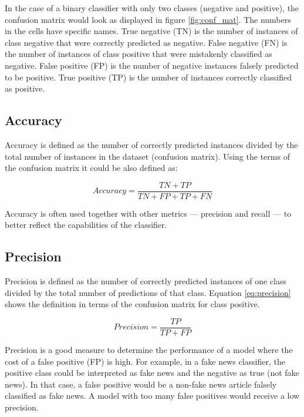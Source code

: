 In the case of a binary classifier with only two classes (negative and positive), the confusion matrix would look as displayed in figure \ref{fig:conf_mat}.
The numbers in the cells have specific names. True negative (TN) is the number of instances of class negative that were correctly predicted as negative. False negative (FN) is the number of instances of class positive that were mistakenly classified as negative. False positive (FP) is the number of negative instances falsely predicted to be positive. True positive (TP) is the number of instances correctly classified as positive.


\subsection*{Accuracy}
Accuracy is defined as the number of correctly predicted instances divided by the total number of instances in the dataset (confusion matrix). Using the terms of the confusion matrix it could be also defined as:

\begin{equation}
    Accuracy = \displaystyle{\frac{TN + TP}{TN + FP + TP + FN}}
\end{equation}

Accuracy is often used together with other metrics --- precision and recall --- to better reflect the capabilities of the classifier.

\subsection*{Precision}
Precision is defined as the number of correctly predicted instances of one class divided by the total number of predictions of that class. Equation \ref{eq:precision} shows the definition in terms of the confusion matrix for class positive.

\begin{equation}
    \label{eq:precision}
    Precision = \displaystyle{\frac{TP}{TP + FP}}
\end{equation}

Precision is a good measure to determine the performance of a model where the cost of a false positive (FP) is high. For example, in a fake news classifier, the positive class could be interpreted as fake news and the negative as true (not fake news). In that case, a false positive would be a non-fake news article falsely classified as fake news. A model with too many false positives would receive a low precision.


